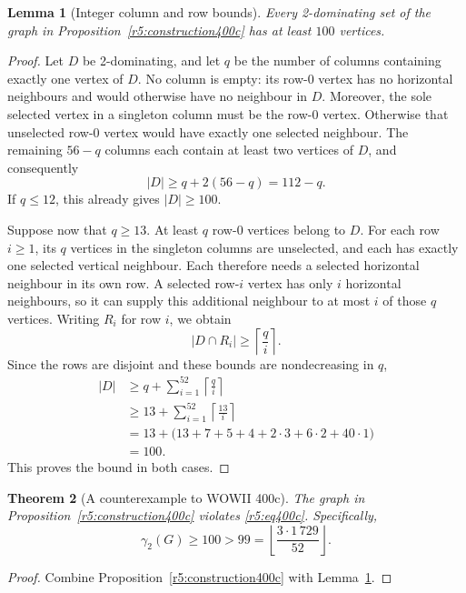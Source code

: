 \documentclass[11pt,a4paper]{article}
\newtheorem{theorem}{Theorem}[section]
\newtheorem{lemma}[theorem]{Lemma}
\theoremstyle{remark}
\begin{document}
\begin{lemma}[Integer column and row bounds]\label{r5:count400c}
Every 2-dominating set of the graph in
Proposition~\ref{r5:construction400c} has at least \(100\) vertices.
\end{lemma}
\begin{proof}
Let \(D\) be 2-dominating, and let \(q\) be the number of columns
containing exactly one vertex of \(D\). No column is empty: its
row-\(0\) vertex has no horizontal neighbours and would otherwise
have no neighbour in \(D\). Moreover, the sole selected vertex in
a singleton column must be the row-\(0\) vertex. Otherwise that
unselected row-\(0\) vertex would have exactly one selected
neighbour. The remaining \(56-q\) columns each contain at least
two vertices of \(D\), and consequently
\begin{equation}\label{r5:columnbound}
|D|\ge q+2(56-q)=112-q.
\end{equation}
If \(q\le12\), this already gives \(|D|\ge100\).

Suppose now that \(q\ge13\). At least \(q\) row-\(0\) vertices
belong to \(D\). For each row \(i\ge1\), its \(q\) vertices in the
singleton columns are unselected, and each has exactly one
selected vertical neighbour. Each therefore needs a selected
horizontal neighbour in its own row. A selected row-\(i\) vertex
has only \(i\) horizontal neighbours, so it can supply this
additional neighbour to at most \(i\) of those \(q\) vertices.
Writing \(R_i\) for row \(i\), we obtain
\[
|D\cap R_i|\ge\left\lceil\frac{q}{i}\right\rceil.
\]
Since the rows are disjoint and these bounds are nondecreasing
in \(q\),
\begin{align*}
|D|
&\ge q+\sum_{i=1}^{52}\left\lceil\frac{q}{i}\right\rceil\\
&\ge13+\sum_{i=1}^{52}\left\lceil\frac{13}{i}\right\rceil\\
&=13+\bigl(13+7+5+4+2\cdot3+6\cdot2+40\cdot1\bigr)\\
&=100.
\end{align*}
This proves the bound in both cases.
\end{proof}

\begin{theorem}[A counterexample to WOWII 400c]\label{r5:thm400c}
The graph in Proposition~\ref{r5:construction400c} violates
\eqref{r5:eq400c}. Specifically,
\[
\gamma_2(G)\ge100>
99=\left\lfloor\frac{3\cdot1\,729}{52}\right\rfloor.
\]
\end{theorem}
\begin{proof}
Combine Proposition~\ref{r5:construction400c} with
Lemma~\ref{r5:count400c}.
\end{proof}
\end{document}
